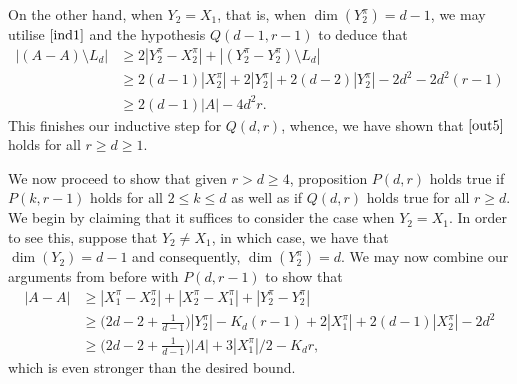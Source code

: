 \documentclass[10pt]{article}
\numberwithin{equation}{section}
\begin{document}
On the other hand, when $Y_2 = X_1$, that is, when $\dim(Y_2^{\pi}) = d-1$, we may utilise $\eqref{ind1}$ and the hypothesis $Q(d-1,r-1)$ to deduce that
 \begin{align*}
 |(A-A) \setminus L_d| & \geq 2|Y_2^{\pi} - X_2^{\pi}| + |(Y_2^{\pi} - Y_2^{\pi})\setminus L_d| \\
 & \geq 2(d-1)|X_2^{\pi}| + 2|Y_2^{\pi}| + 2(d-2)|Y_2^{\pi}| - 2d^2 - 2d^2(r-1)  \\
 & \geq 2(d-1) |A| - 4d^2r.
 \end{align*}
This finishes our inductive step for $Q(d,r)$, whence, we have shown that $\eqref{out5}$ holds for all $r \geq d \geq 1$.
\par
 
We now proceed to show that given $r > d \geq 4$, proposition $P(d,r)$ holds true if $P(k,r-1)$ holds for all $2 \leq k \leq d$ as well as if $Q(d,r)$ holds true for all $r\geq d$. We begin by claiming that it suffices to consider the case when $Y_2 = X_1$. In order to see this, suppose that $Y_2 \neq X_1$, in which case, we have that $\dim(Y_2) = d-1$ and consequently, $\dim(Y_2^{\pi}) = d$. We may now combine our arguments from before with $P(d,r-1)$ to show that
\begin{align*}
|A-A| & \geq  | X_1^{\pi} - X_2^{\pi}| + | X_2^{\pi} - X_1^{\pi}| + |Y_2^{\pi} - Y_2^{\pi}| \\
        & \geq \bigg(2d - 2 + \frac{1}{d-1}\bigg)|Y_2^{\pi}| - K_{d}(r-1) + 2|X_1^{\pi}|  + 2(d-1)|X_2^{\pi}|  - 2d^2 \\
        & \geq \bigg(2d - 2 + \frac{1}{d-1}\bigg)|A|  + 3|X_1^{\pi}|/2 - K_d r,
\end{align*} 
which is even stronger than the desired bound.
\par
\end{document}
